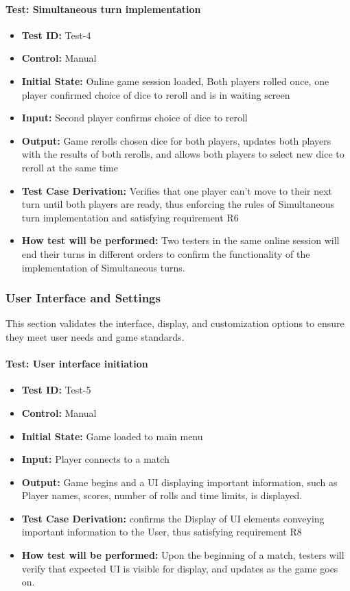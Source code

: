 \documentclass[12pt, titlepage]{article}
\begin{document}
\paragraph{\label{test-4}Test: Simultaneous turn implementation}
\begin{itemize}
    \item \textbf{Test ID:} Test-4
    \item \textbf{Control:} Manual
    \item \textbf{Initial State:} Online game session loaded, Both players rolled once, one player confirmed choice of dice to reroll and is in waiting screen
    \item \textbf{Input:} Second player confirms choice of dice to reroll 
    \item \textbf{Output:} Game rerolls chosen dice for both players, updates both players with the results of both rerolls, and allows both players to select new dice to reroll at the same time
    \item \textbf{Test Case Derivation:} Verifies that one player can’t move to their next turn until both players are ready, thus enforcing the rules of Simultaneous turn implementation and satisfying requirement R6
    \item \textbf{How test will be performed:} Two testers in the same online session will end their turns in different orders to confirm the functionality of the implementation of Simultaneous turns.
\end{itemize}

\subsubsection{User Interface and Settings}

This section validates the interface, display, and customization options to ensure they meet user needs and game standards.

\paragraph{\label{test-5}Test: User interface initiation}
\begin{itemize}
    \item \textbf{Test ID:} Test-5
    \item \textbf{Control:} Manual
    \item \textbf{Initial State:} Game loaded to main menu
    \item \textbf{Input:} Player connects to a match
    \item \textbf{Output:} Game begins and a UI displaying important information, such as Player names, scores, number of rolls and time limits, is displayed.
    \item \textbf{Test Case Derivation:} confirms the Display of UI elements conveying important information to the User, thus satisfying requirement R8
    \item \textbf{How test will be performed:} Upon the beginning of a match, testers will verify that expected UI is visible for display, and updates as the game goes on.
\end{itemize}
\end{document}
